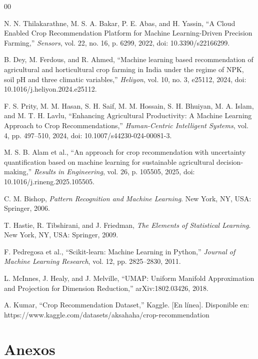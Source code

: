 \documentclass[conference]{IEEEtran}
\begin{document}
\begin{thebibliography}{00}

N. N. Thilakarathne, M. S. A. Bakar, P. E. Abas, and H. Yassin,
``A Cloud Enabled Crop Recommendation Platform for Machine Learning-Driven Precision Farming,''
\textit{Sensors}, vol. 22, no. 16, p. 6299, 2022,
doi: 10.3390/s22166299.

B. Dey, M. Ferdous, and R. Ahmed,
``Machine learning based recommendation of agricultural and horticultural crop farming in India under the regime of NPK, soil pH and three climatic variables,''
\textit{Heliyon}, vol. 10, no. 3, e25112, 2024,
doi: 10.1016/j.heliyon.2024.e25112.

F. S. Prity, M. M. Hasan, S. H. Saif, M. M. Hossain, S. H. Bhuiyan, M. A. Islam, and M. T. H. Lavlu,
``Enhancing Agricultural Productivity: A Machine Learning Approach to Crop Recommendations,''
\textit{Human-Centric Intelligent Systems}, vol. 4, pp. 497--510, 2024,
doi: 10.1007/s44230-024-00081-3.

M. S. B. Alam et al.,
``An approach for crop recommendation with uncertainty quantification based on machine learning for sustainable agricultural decision-making,''
\textit{Results in Engineering}, vol. 26, p. 105505, 2025,
doi: 10.1016/j.rineng.2025.105505.

C. M. Bishop,
\textit{Pattern Recognition and Machine Learning}.
New York, NY, USA: Springer, 2006.

T. Hastie, R. Tibshirani, and J. Friedman,
\textit{The Elements of Statistical Learning}.
New York, NY, USA: Springer, 2009.

F. Pedregosa et al.,
``Scikit-learn: Machine Learning in Python,''
\textit{Journal of Machine Learning Research},
vol. 12, pp. 2825--2830, 2011.

L. McInnes, J. Healy, and J. Melville,
``UMAP: Uniform Manifold Approximation and Projection for Dimension Reduction,''
arXiv:1802.03426, 2018.

A. Kumar, ``Crop Recommendation Dataset,'' Kaggle. [En línea]. Disponible en: https://www.kaggle.com/datasets/aksahaha/crop-recommendation

\end{thebibliography}


\section{Anexos}
\end{document}
